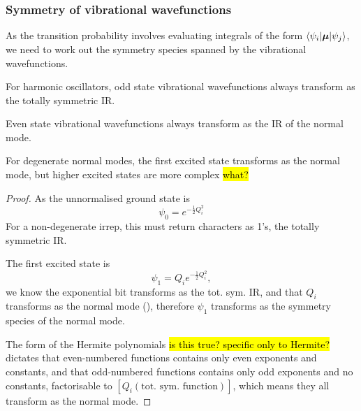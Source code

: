 \subsubsection{Symmetry of vibrational wavefunctions}
As the transition probability involves evaluating integrals of the form $\langle \psi_i |\boldsymbol{\mu}|\psi_j  \rangle $, we need to work out the symmetry species spanned by the vibrational wavefunctions. 
\begin{thrm}
For harmonic oscillators, odd state vibrational wavefunctions always transform as the totally symmetric IR.\par
Even state vibrational wavefunctions always transform as the IR of the normal mode.\par
For degenerate normal modes, the first excited state transforms as the normal mode, but higher excited states are more complex \hl{what?}
\end{thrm}
\begin{proof}
	As the unnormalised ground state is
	\begin{equation}
		\psi_0=e^{-\frac{1}{2}Q_i^2}
	\end{equation}
	For a non-degenerate irrep, this must return characters as 1's, \ie the totally symmetric IR.\par
	The first excited state is
	\begin{equation}
		\psi_1=Q_ie^{-\frac{1}{2}Q_i^2},
	\end{equation}
	we know the exponential bit transforms as the tot. sym. IR, and that $Q_i$ transforms as the normal mode (), therefore $\psi_1$ transforms as the symmetry species of the normal mode. \par
	The form of the Hermite polynomials \hl{is this true? specific only to Hermite?} dictates that even-numbered functions contains only even exponents and constants, and that odd-numbered functions contains only odd exponents and no constants, \ie factorisable to $[Q_i(\text{tot. sym. function})]$, which means they all transform as the normal mode. 
\end{proof}

